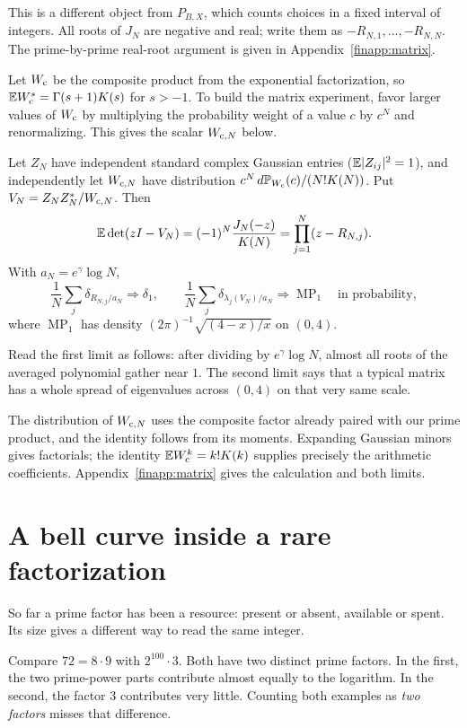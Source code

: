 This is a different object from $P_{B,X}$, which counts choices in a
fixed interval of integers.  All roots of $J_N$ are negative and real;
write them as $-R_{N,1},\ldots,-R_{N,N}$.
The prime-by-prime real-root argument is given in
Appendix~\ref{finapp:matrix}.

Let $W_{\mathrm c}$ be the composite product from the exponential factorization,
so $\mathbb E W_{\mathrm c}^s=\Gamma(s+1)K(s)$ for $s>-1$.
To build the matrix experiment, favor larger values of $W_{\mathrm c}$ by
multiplying the probability weight of a value $c$ by $c^N$ and
renormalizing.  This gives the scalar $W_{\mathrm c,N} $ below.
\begin{theorem}
\label{fin:wishart}
Let $Z_N$ have independent standard complex Gaussian entries
($\mathbb E|Z_{ij}|^2=1$), and independently let $W_{\mathrm c,N} $ have distribution
$c^N\,d\mathbb P_{W_{\mathrm c}}(c)/(N!K(N))$.  Put $V_N=Z_NZ_N^*/W_{\mathrm c,N} $.
Then
\[
 \mathbb E\det(zI-V_N)=(-1)^N\frac{J_N(-z)}{K(N)}
              =\prod_{j=1}^N(z-R_{N,j}).
\]
With $a_N=e^\gamma\log N$,
\[
 \frac1N\sum_j\delta_{R_{N,j}/a_N}\Longrightarrow\delta_1,\qquad
 \frac1N\sum_j\delta_{\lambda_j(V_N)/a_N}
       \Longrightarrow\operatorname{MP}_1
       \quad\text{in probability},
\]
where $\operatorname{MP}_1$ has density
$(2\pi)^{-1}\sqrt{(4-x)/x}$ on $(0,4)$.
\end{theorem}

Read the first limit as follows: after dividing by $e^\gamma\log N$,
almost all roots of the averaged polynomial gather near $1$.
The second limit says that a typical matrix has a whole spread of
eigenvalues across $(0,4)$ on that very same scale.

The distribution of $W_{\mathrm c,N} $ uses the composite factor already paired with
our prime product, and the identity follows from its moments.
Expanding Gaussian minors gives factorials; the identity
$\mathbb E W_{\mathrm c}^k=k!K(k)$ supplies precisely the arithmetic coefficients.
Appendix~\ref{finapp:matrix} gives the calculation and both limits.



\section{A bell curve inside a rare factorization}\label{fin:entropy}
So far a prime factor has been a resource: present or absent, available
or spent.  Its size gives a different way to read the same integer.

Compare $72=8\cdot9$ with $2^{100}\cdot3$.
Both have two distinct prime factors.  In the first, the two prime-power
parts contribute almost equally to the logarithm.
In the second, the factor $3$ contributes very little.
Counting both examples as \emph{two factors} misses that difference.

